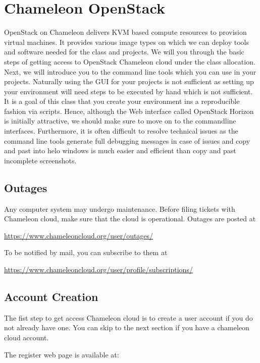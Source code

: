 \section{Chameleon OpenStack}
\label{s:chameleon-openstack}

OpenStack on Chameleon delivers KVM based compute resources to
provision virtual machines. It provides various image types on
which we can deploy tools and software needed for the class and
projects. We will you through the basic steps of getting access to
OpenStack Chameleon cloud under the class allocation. Next, we will
introduce you to the command line tools which you can use in your
projects. Naturally using the GUI for your projects is not sufficient
as setting up your environment will need steps to be executed by hand
which is not sufficient. It is a goal of this class that you create
your environment ins a reproducible fashion via scripts.  Hence,
although the Web interface called OpenStack Horizon is initially
attractive, we should make sure to move on to the commandline
interfaces.  Furthermore, it is often difficult to resolve technical
issues as the command line tools generate full debugging messages in
case of issues and copy and past into helo windows is much easier and
efficient than copy and past incomplete screenshots.


\subsection{Outages}

Any computer system may undergo maintenance. Before filing tickets
with Chameleon cloud, make sure that the cloud is operational. Outages
are posted at 

\url{https://www.chameleoncloud.org/user/outages/}

To be notified by mail, you can subscribe to them at 

\url{https://www.chameleoncloud.org/user/profile/subscriptions/}

\subsection{Account Creation}

The fist step to get access Chameleon cloud is to create a user
account if you do not already have one. You can skip to the next
section if you have a chameleon cloud account.

The register web page is available at:

